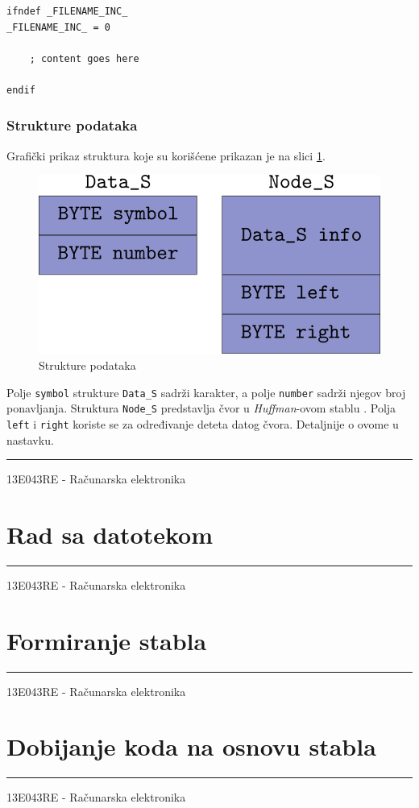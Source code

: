 \documentclass[a4paper, 12pt]{article}
\newcommand{\btmline}{
\vfill
\rule{0.9\textwidth}{0.4mm}
\begin{center}
13E043RE - Računarska elektronika
\end{center}}
\begin{document}
\begin{verbatim}
ifndef _FILENAME_INC_
_FILENAME_INC_ = 0

	; content goes here
	
endif
\end{verbatim}

\subsubsection*{Strukture podataka}
Grafički prikaz struktura koje su korišćene prikazan je na slici \ref{struct}. 

\begin{figure}[h!]
\centering
\includegraphics[width=.5\textwidth]{structures}
\caption{Strukture podataka}
\label{struct}
\end{figure}

Polje \verb|symbol| strukture \verb|Data_S| sadrži karakter, a polje \verb|number| sadrži njegov broj ponavljanja.
Struktura \verb|Node_S| predstavlja čvor u \textit{Huffman}-ovom stablu . Polja \verb|left| i \verb|right| koriste se 
za određivanje deteta datog čvora. Detaljnije o ovome u nastavku.

\btmline\newpage

\section*{Rad sa datotekom}



\btmline\newpage
\section*{Formiranje stabla}
\btmline\newpage
\section*{Dobijanje koda na osnovu stabla}


\btmline\newpage
\end{document}
